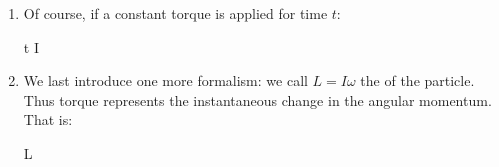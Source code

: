 \begin{enumerate}
  \item Of course, if a constant torque is applied for time $t$:

  \begin{nedqn}
    \tau t
  \eqcol
    I \Delta \omega
  \end{nedqn}

  \item We last introduce one more formalism: we call $L = I\omega$ the
   of the particle. Thus torque represents the
  instantaneous change in the angular momentum. That is:

  \begin{nedqn}
    \tau
  \eqcol
     L
  \end{nedqn}
\end{enumerate}
